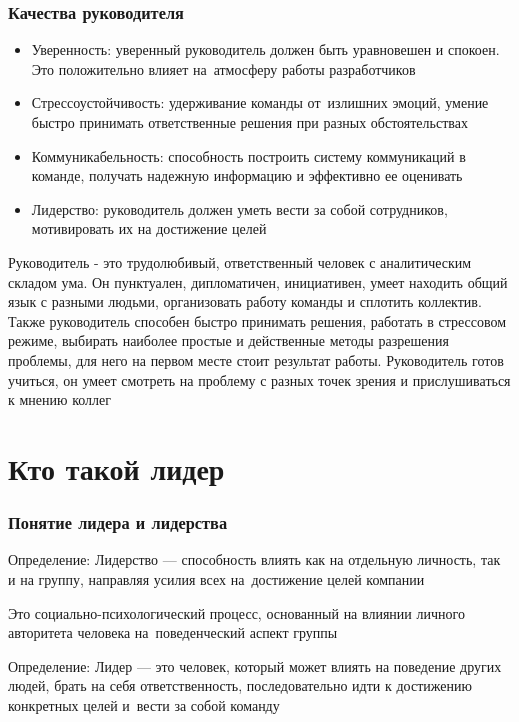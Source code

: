 \documentclass{../industrial-development}
\begin{document}
   
\begin{frame} \frametitle{Качества руководителя}

  \begin{itemize}
  
  \item Уверенность: уверенный руководитель должен быть уравновешен и спокоен. Это положительно влияет на~атмосферу работы разработчиков 
 \item Стрессоустойчивость: удерживание команды от~излишних эмоций, умение быстро принимать ответственные решения при разных обстоятельствах
 \item Коммуникабельность: способность построить систему коммуникаций в команде, получать надежную информацию и эффективно ее оценивать
 \item Лидерство: руководитель должен уметь вести за собой сотрудников, мотивировать их на достижение целей
  \end{itemize}
\end{frame}

\lecturenotes Руководитель - это трудолюбивый, ответственный человек с аналитическим складом ума. Он пунктуален, дипломатичен, инициативен, умеет находить общий язык с разными людьми, организовать работу команды и сплотить коллектив. Также руководитель способен быстро принимать решения, работать в стрессовом режиме, выбирать наиболее простые и действенные методы разрешения проблемы, для него на первом месте стоит результат работы. Руководитель готов учиться, он умеет смотреть на проблему с разных точек зрения и прислушиваться к мнению коллег



\section{Кто такой лидер}

\begin{frame} \frametitle {Понятие лидера и лидерства}

\begin{block}{Определение:}
Лидерство --- \alert{способность влиять} как на отдельную личность, так и на группу, направляя усилия всех на~достижение целей компании
\end{block}
Это социально-психологический процесс, основанный на влиянии личного авторитета человека на~поведенческий аспект группы



\begin{block}{Определение:}
Лидер --- это человек, который может \alert{влиять} на поведение других людей, \alert{брать} на себя \alert{ответственность}, последовательно \alert{идти к достижению} конкретных \alert{целей} и~\alert{вести} за собой \alert{команду}
\end{block}

\end{frame}
\end{document}
